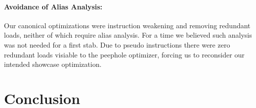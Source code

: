 \documentclass{article}
\begin{document}
\paragraph{Avoidance of Alias Analysis: }
Our canonical optimizations were instruction weakening and removing
redundant loads, neither of which require alias analysis.  For a time
we believed such analysis was not needed for a first stab.  Due to
pseudo instructions there were zero redundant loads visiable to the
peephole optimizer, forcing us to reconsider our intended showcase
optimization.

\section{Conclusion}
\end{document}
